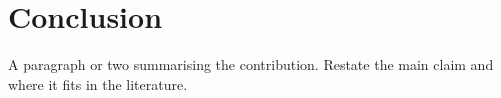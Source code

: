 \documentclass{rrvix}
\begin{document}


\section{Conclusion}
\label{sec:conclusion}

A paragraph or two summarising the contribution. Restate the main claim
and where it fits in the literature.




\end{document}
